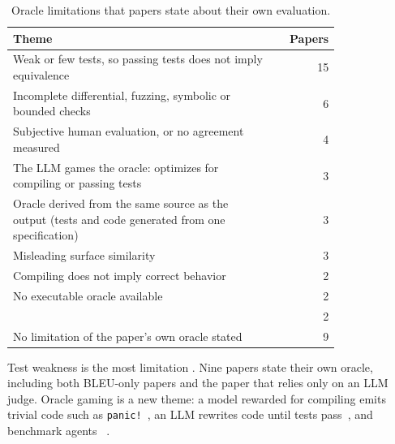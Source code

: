 \begin{table}[t]
  \centering
  \caption{Oracle limitations that papers state about their own evaluation. }
  \label{tab:limits}
  \small
  \begin{tabular}{@{}P{0.8\linewidth}r@{}}
    \toprule
    Theme & Papers \\
    \midrule
    Weak or few tests, so passing tests does not imply equivalence & 15 \\
    Incomplete differential, fuzzing, symbolic or bounded checks & 6 \\
    Subjective human evaluation, or no agreement measured & 4 \\
    The LLM games the oracle: optimizes for compiling or passing tests & 3 \\
    Oracle derived from the same source as the output (tests and code generated from one specification) & 3 \\
    Misleading surface similarity & 3 \\
    Compiling does not imply correct behavior & 2 \\
    No executable oracle available & 2 \\
     & 2 \\
    \midrule
    No limitation of the paper's own oracle stated & 9 \\
    \bottomrule
  \end{tabular}
\end{table}

Test weakness is the most  limitation . Nine papers state  their own oracle, including both BLEU-only papers and the paper that relies only on an LLM judge. Oracle gaming is a new theme: a model rewarded for compiling emits trivial code such as \texttt{panic!}~\cite{dgir}, an LLM rewrites code until tests pass~\cite{smartc2rust}, and benchmark agents ~\cite{freshbrew}.

